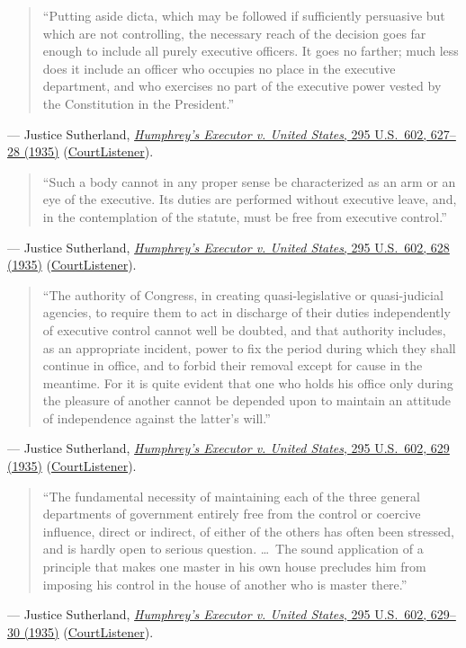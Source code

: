 \documentclass[12pt]{article}
\begin{document}
\begin{quote}
``Putting aside dicta, which may be followed if sufficiently persuasive but which are not controlling, the necessary reach of the decision goes far enough to include all purely executive officers. It goes no farther; much less does it include an officer who occupies no place in the executive department, and who exercises no part of the executive power vested by the Constitution in the President.''
\end{quote}
\noindent --- Justice Sutherland, \href{https://supreme.justia.com/cases/federal/us/295/602/}{\textit{Humphrey's Executor v. United States}, 295 U.S.\ 602, 627--28 (1935)} (\href{https://www.courtlistener.com/opinion/102475/humphreys-v-united-states/}{CourtListener}).

\begin{quote}
``Such a body cannot in any proper sense be characterized as an arm or an eye of the executive. Its duties are performed without executive leave, and, in the contemplation of the statute, must be free from executive control.''
\end{quote}
\noindent --- Justice Sutherland, \href{https://supreme.justia.com/cases/federal/us/295/602/}{\textit{Humphrey's Executor v. United States}, 295 U.S.\ 602, 628 (1935)} (\href{https://www.courtlistener.com/opinion/102475/humphreys-v-united-states/}{CourtListener}).

\begin{quote}
``The authority of Congress, in creating quasi-legislative or quasi-judicial agencies, to require them to act in discharge of their duties independently of executive control cannot well be doubted, and that authority includes, as an appropriate incident, power to fix the period during which they shall continue in office, and to forbid their removal except for cause in the meantime. For it is quite evident that one who holds his office only during the pleasure of another cannot be depended upon to maintain an attitude of independence against the latter's will.''
\end{quote}
\noindent --- Justice Sutherland, \href{https://supreme.justia.com/cases/federal/us/295/602/}{\textit{Humphrey's Executor v. United States}, 295 U.S.\ 602, 629 (1935)} (\href{https://www.courtlistener.com/opinion/102475/humphreys-v-united-states/}{CourtListener}).

\begin{quote}
``The fundamental necessity of maintaining each of the three general departments of government entirely free from the control or coercive influence, direct or indirect, of either of the others has often been stressed, and is hardly open to serious question. \ldots\ The sound application of a principle that makes one master in his own house precludes him from imposing his control in the house of another who is master there.''
\end{quote}
\noindent --- Justice Sutherland, \href{https://supreme.justia.com/cases/federal/us/295/602/}{\textit{Humphrey's Executor v. United States}, 295 U.S.\ 602, 629--30 (1935)} (\href{https://www.courtlistener.com/opinion/102475/humphreys-v-united-states/}{CourtListener}).
\end{document}
